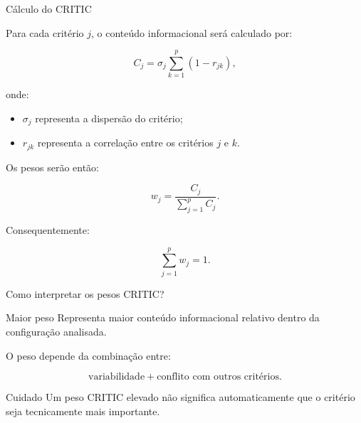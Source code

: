 \begin{frame}{Cálculo do CRITIC}

    Para cada critério \(j\), o conteúdo informacional será calculado por:

    \[
    C_j
    =
    \sigma_j
    \sum_{k=1}^{p}
    (1-r_{jk}),
    \]

    onde:

    \begin{itemize}
        \item \(\sigma_j\) representa a dispersão do critério;
        \item \(r_{jk}\) representa a correlação entre os critérios
              \(j\) e \(k\).
    \end{itemize}

    Os pesos serão então:

    \[
    w_j
    =
    \frac{C_j}
         {\sum_{j=1}^{p}C_j}.
    \]

    \vspace{0.2cm}

    Consequentemente:

    \[
    \sum_{j=1}^{p}w_j=1.
    \]

\end{frame}



\begin{frame}{Como interpretar os pesos CRITIC?}

    \begin{block}{Maior peso}
        Representa maior conteúdo informacional relativo dentro da
        configuração analisada.
    \end{block}

    \vspace{0.3cm}

    O peso depende da combinação entre:

    \[
    \text{variabilidade}
    +
    \text{conflito com outros critérios}.
    \]

    \vspace{0.3cm}

    \begin{alertblock}{Cuidado}
        Um peso CRITIC elevado não significa automaticamente que o
        critério seja tecnicamente mais importante.
    \end{alertblock}

\end{frame}


